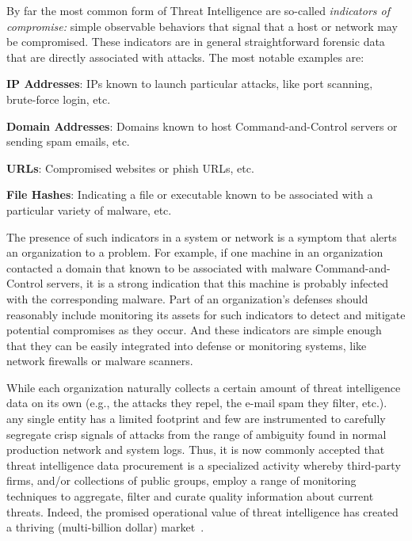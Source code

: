 By far the most common form of Threat Intelligence are so-called 
\emph{indicators of compromise:} simple observable behaviors that 
signal that a host or network may be compromised. These indicators 
are in general straightforward forensic data that are directly 
associated with attacks. The most notable examples are:
\begin{prettylist}
    \item \textbf{IP Addresses}: IPs known to launch particular 
    attacks, like port scanning, brute-force login, etc.
    \item \textbf{Domain Addresses}: Domains known to host 
    Command-and-Control servers or sending spam emails, etc.
    \item \textbf{URLs}: Compromised websites or phish URLs, etc.
    \item \textbf{File Hashes}: Indicating a file or executable 
    known to be associated with a particular variety of malware, etc.
\end{prettylist}

The presence of such indicators in a system or network is a symptom 
that alerts an organization to a problem. For example, if one 
machine in an organization contacted a domain that known to be
associated with malware Command-and-Control servers, it is a strong
indication that this machine is probably infected with the 
corresponding malware. Part of an organization's defenses 
should reasonably include monitoring its assets
for such indicators to detect and mitigate potential compromises as
they occur. And these indicators are simple enough that they can be
easily integrated into defense or monitoring systems, like network
firewalls or malware scanners.

While each organization naturally collects a certain amount of threat
intelligence data on its own (e.g., the attacks they repel, the e-mail
spam they filter, etc.). any single entity has a limited footprint and
few are instrumented to carefully segregate crisp signals of attacks
from the range of ambiguity found in normal production network and
system logs. Thus, it is now commonly accepted that threat
intelligence data procurement is a specialized activity whereby
third-party firms, and/or collections of public groups, employ a range
of monitoring techniques to aggregate, filter and curate quality
information about current threats.  Indeed, the promised operational
value of threat intelligence has created a thriving (multi-billion
dollar) market~\cite{timarket}. 

